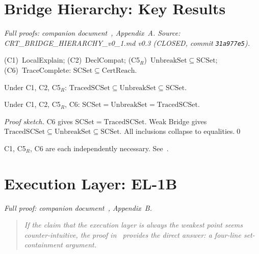 \appendix

\section{Bridge Hierarchy: Key Results}
\label{app:bridge}

\noindent\textit{Full proofs: companion document~\cite{proofs-companion}, Appendix~A.
Source: CRT\_BRIDGE\_HIERARCHY\_v0\_1.md v0.3 (CLOSED, commit \texttt{31a977e5}).}

\begin{definition}
(C1)~LocalExplain; (C2)~DeclCompat;
(C5$_R$)~$\mathrm{UnbreakSet} \subseteq \mathrm{SCSet}$;
(C6)~TraceComplete: $\mathrm{SCSet} \subseteq \mathrm{CertReach}$.
\end{definition}

\begin{theorem}\label{thm:weak-bridge}
Under C1, C2, C5$_R$:
$\mathrm{TracedSCSet} \subseteq \mathrm{UnbreakSet} \subseteq \mathrm{SCSet}$.
\end{theorem}

\begin{theorem}\label{thm:full-bridge}
Under C1, C2, C5$_R$, C6:
$\mathrm{SCSet} = \mathrm{UnbreakSet} = \mathrm{TracedSCSet}$.
\end{theorem}

\begin{proof}[Proof sketch]
C6 gives $\mathrm{SCSet} = \mathrm{TracedSCSet}$.
Weak Bridge gives $\mathrm{TracedSCSet} \subseteq \mathrm{UnbreakSet} \subseteq \mathrm{SCSet}$.
All inclusions collapse to equalities.\qed
\end{proof}

\begin{proposition}[Minimality]
C1, C5$_R$, C6 are each independently necessary. See~\cite{proofs-companion}.
\end{proposition}

\section{Execution Layer: EL-1B}
\label{app:el}

\noindent\textit{Full proof: companion document~\cite{proofs-companion}, Appendix~B.}

\begin{quote}\itshape
If the claim that the execution layer is always the weakest point
seems counter-intuitive, the proof in~\cite{proofs-companion}
provides the direct answer: a four-line set-containment argument.
\end{quote}

